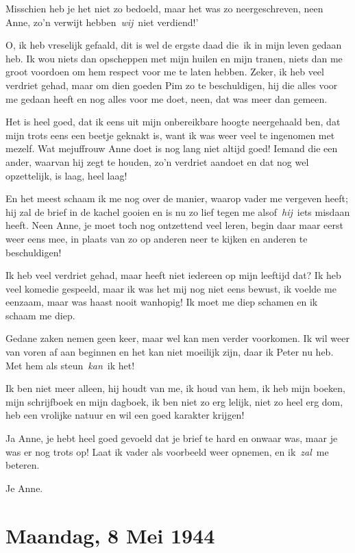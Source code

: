 \documentclass{book}
\begin{document}
Misschien heb je het niet zo bedoeld, maar het was zo neergeschreven, neen Anne,
zo'n verwijt hebben~\emph{wij}~niet verdiend!'

O, ik heb vreselijk gefaald, dit is wel de ergste daad die~ik in mijn leven
gedaan heb. Ik wou niets dan opscheppen met mijn huilen en mijn tranen, niets
dan me groot voordoen om hem respect voor me te laten hebben. Zeker, ik heb veel
verdriet gehad, maar om dien goeden Pim zo te beschuldigen, hij die alles voor
me gedaan heeft en nog alles voor me doet, neen, dat was meer dan gemeen.

Het is heel goed, dat ik eens uit mijn onbereikbare hoogte neergehaald ben, dat
mijn trots eens een beetje geknakt is, want ik was weer veel te ingenomen met
mezelf. Wat mejuffrouw Anne doet is nog lang niet altijd goed! Iemand die een
ander, waarvan hij zegt te houden, zo'n verdriet aandoet en dat nog wel
opzettelijk, is laag, heel laag!

En het meest schaam ik me nog over de manier, waarop vader me vergeven heeft;
hij zal de brief in de kachel gooien en is nu zo lief tegen me
alsof~\emph{hij}~iets misdaan heeft. Neen Anne, je moet toch nog ontzettend veel
leren, begin daar maar eerst weer eens mee, in plaats van zo op anderen neer te
kijken en anderen te beschuldigen!

Ik heb veel verdriet gehad, maar heeft niet iedereen op mijn leeftijd dat? Ik
heb veel komedie gespeeld, maar ik was het mij nog niet eens bewust, ik voelde
me eenzaam, maar was haast nooit wanhopig! Ik moet me diep schamen en ik schaam
me diep.

Gedane zaken nemen geen keer, maar wel kan men verder voorkomen. Ik wil weer van
voren af aan beginnen en het kan niet moeilijk zijn, daar ik Peter nu heb. Met
hem als steun~\emph{kan}~ik het!

Ik ben niet meer alleen, hij houdt van me, ik houd van hem, ik heb mijn boeken,
mijn schrijfboek en mijn dagboek, ik ben niet zo erg lelijk, niet zo heel erg
dom, heb een vrolijke natuur en wil een goed karakter krijgen!

Ja Anne, je hebt heel goed gevoeld dat je brief te hard en onwaar was, maar je
was er nog trots op! Laat ik vader als voorbeeld weer opnemen, en
ik~\emph{zal}~me beteren.

Je Anne.

\section*{Maandag, 8 Mei 1944}
\end{document}
